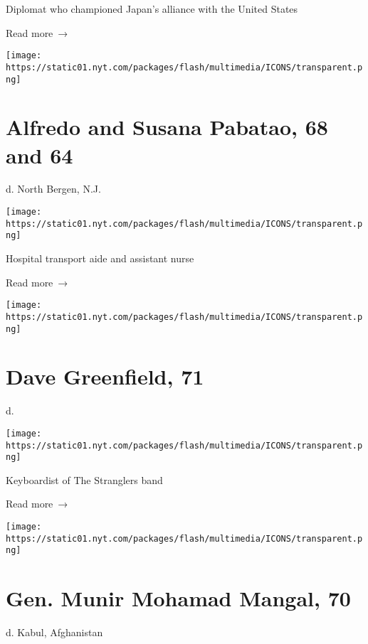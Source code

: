 Diplomat who championed Japan's alliance with the United States

 Read more~→

\href{https://www.nytimes.com/2020/05/07/nyregion/alfredo-and-susana-pabatao-dead-coronavirus.html}{}

\texttt{[image: https://static01.nyt.com/packages/flash/multimedia/ICONS/transparent.png]}

\hypertarget{alfredo-and-susana-pabatao-68-and-64}{%
\section{Alfredo and Susana Pabatao, 68 and
64}\label{alfredo-and-susana-pabatao-68-and-64}}

d. North Bergen, N.J.

\texttt{[image: https://static01.nyt.com/packages/flash/multimedia/ICONS/transparent.png]}

Hospital transport aide and assistant nurse

 Read more~→

\href{https://www.nytimes.com/2020/05/07/obituaries/dave-greenfield-dead-coronavirus.html}{}

\texttt{[image: https://static01.nyt.com/packages/flash/multimedia/ICONS/transparent.png]}

\hypertarget{dave-greenfield-71}{%
\section{Dave Greenfield, 71}\label{dave-greenfield-71}}

d.

\texttt{[image: https://static01.nyt.com/packages/flash/multimedia/ICONS/transparent.png]}

Keyboardist of The Stranglers band

 Read more~→

\href{https://www.nytimes.com/2020/05/06/obituaries/Munir-Mangal-dead-coronavirus.html}{}

\texttt{[image: https://static01.nyt.com/packages/flash/multimedia/ICONS/transparent.png]}

\hypertarget{gen-munir-mohamad-mangal-70}{%
\section{Gen. Munir Mohamad Mangal,
70}\label{gen-munir-mohamad-mangal-70}}

d. Kabul, Afghanistan

